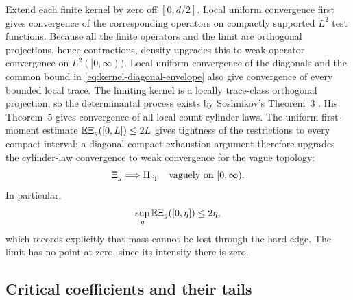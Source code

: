 Extend each finite kernel by zero off \([0,d/2]\).  Local uniform convergence
first gives convergence of the corresponding operators on compactly
supported \(L^2\) test functions.  Because all the finite operators and the
limit are orthogonal projections, hence contractions, density upgrades this
to weak-operator convergence on \(L^2([0,\infty))\).  Local uniform convergence
of the diagonals and the common bound in
\eqref{eq:kernel-diagonal-envelope} also give convergence of every bounded
local trace.  The limiting kernel is a locally trace-class orthogonal
projection, so the determinantal process exists by Soshnikov's Theorem~3
\cite{Soshnikov2000}.  His Theorem~5 gives convergence of all local
count-cylinder laws.  The uniform first-moment estimate
\(\mathbb E\Xi_g([0,L])\le2L\) gives tightness of the restrictions to every compact
interval; a diagonal compact-exhaustion argument therefore upgrades the
cylinder-law convergence to weak convergence for the vague topology:
\begin{equation}
 \Xi_g\Longrightarrow\Pi_{\mathrm{Sp}}
 \quad\text{vaguely on }[0,\infty).
 \label{eq:closed-edge-process-convergence}
\end{equation}
In particular,
\begin{equation}
 \sup_g\mathbb E\Xi_g([0,\eta])\le2\eta,
 \label{eq:no-escape-zero}
\end{equation}
which records explicitly that mass cannot be lost through the hard edge.
The limit has no point at zero, since its intensity there is zero.

\subsection{Critical coefficients and their tails}


